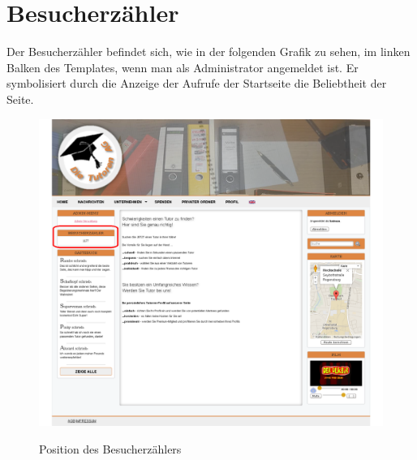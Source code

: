 
\section{Besucherzähler}

Der Besucherzähler befindet sich, wie in der folgenden Grafik zu sehen, im linken Balken des Templates, wenn man als Administrator angemeldet ist. Er symbolisiert durch die Anzeige der Aufrufe der Startseite die Beliebtheit der Seite.

\begin{figure}[!htbp]
 \centering
 \includegraphics[width=1\textwidth]{../Screenshots/de/admin/Startseite_logged_in_admin_counter}
 \label{fig:counter}
 \caption{Position des Besucherzählers}
\end{figure}

